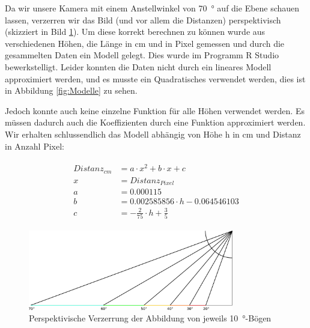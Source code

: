 \documentclass[a4paper]{report}
\begin{document}
Da wir unsere Kamera mit einem Anstellwinkel von \SI{70}{\degree} auf die Ebene schauen lassen, verzerren wir das Bild (und vor allem die Distanzen) perspektivisch (skizziert in Bild \ref{fig:Perspektive}). Um diese korrekt berechnen zu können wurde aus verschiedenen Höhen, die Länge in cm und in Pixel gemessen und durch die gesammelten Daten ein Modell gelegt. Dies wurde im Programm R Studio bewerkstelligt. Leider konnten die Daten nicht durch ein lineares Modell approximiert werden, und es musste ein Quadratisches verwendet werden, dies ist in Abbildung \ref{fig:Modelle} zu sehen.

Jedoch konnte auch keine einzelne Funktion für alle Höhen verwendet werden. Es müssen dadurch auch die Koeffizienten durch eine Funktion approximiert werden. Wir erhalten schlussendlich das Modell abhängig von Höhe h in cm und Distanz in Anzahl Pixel:

\begin{align*}
	\begin{split}
		Distanz_{cm} &= a\cdot x^2 + b\cdot x + c
		\\
		x &= Distanz_{Pixel}
		\\
		a &= 0.000115
		\\
		b &= 0.002585856 \cdot h - 0.064546103
		\\
		c &= -\frac{2}{75} \cdot h + \frac{3}{5}
	\end{split}
\end{align*}

\begin{figure}[h]
	\centering
	\includegraphics[keepaspectratio, width=0.8\textwidth]{Perspektive}
	\caption{Perspektivische Verzerrung der Abbildung von jeweils \SI{10}{\degree}-Bögen}
	\label{fig:Perspektive}
\end{figure}
\end{document}

